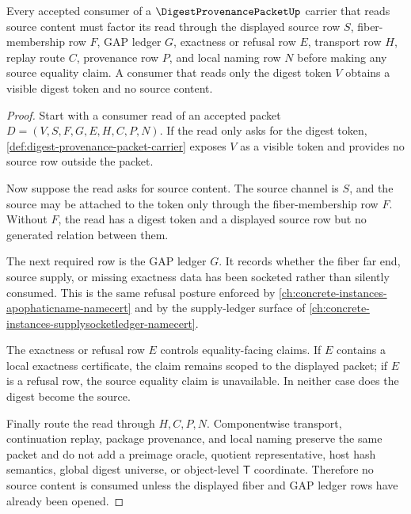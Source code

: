 \begin{theorem}
\label{thm:digest-provenance-packet-no-hidden-source-consumption}
Every accepted consumer of a $\DigestProvenancePacketUp$ carrier that reads source content must factor its read through the displayed source row $S$, fiber-membership row $F$, GAP ledger $G$, exactness or refusal row $E$, transport row $H$, replay route $C$, provenance row $P$, and local naming row $N$ before making any source equality claim. A consumer that reads only the digest token $V$ obtains a visible digest token and no source content.
\end{theorem}
\begin{proof}
Start with a consumer read of an accepted packet $D=(V,S,F,G,E,H,C,P,N)$. If the read only asks for the digest token, \autoref{def:digest-provenance-packet-carrier} exposes $V$ as a visible token and provides no source row outside the packet.

Now suppose the read asks for source content. The source channel is $S$, and the source may be attached to the token only through the fiber-membership row $F$. Without $F$, the read has a digest token and a displayed source row but no generated relation between them.

The next required row is the GAP ledger $G$. It records whether the fiber far end, source supply, or missing exactness data has been socketed rather than silently consumed. This is the same refusal posture enforced by \autoref{ch:concrete-instances-apophaticname-namecert} and by the supply-ledger surface of \autoref{ch:concrete-instances-supplysocketledger-namecert}.

The exactness or refusal row $E$ controls equality-facing claims. If $E$ contains a local exactness certificate, the claim remains scoped to the displayed packet; if $E$ is a refusal row, the source equality claim is unavailable. In neither case does the digest become the source.

Finally route the read through $H,C,P,N$. Componentwise transport, continuation replay, package provenance, and local naming preserve the same packet and do not add a preimage oracle, quotient representative, host hash semantics, global digest universe, or object-level $\mathsf{T}$ coordinate. Therefore no source content is consumed unless the displayed fiber and GAP ledger rows have already been opened.
\end{proof}

